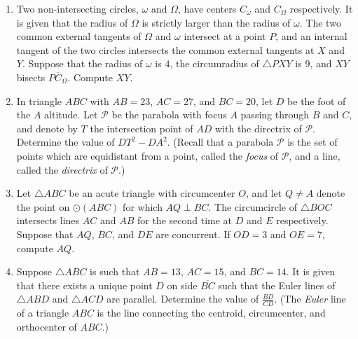 \documentclass[10pt]{article}
\begin{document}
\begin{enumerate}
\item Two non-intersecting circles, $\omega$ and $\Omega$, have centers $C_\omega$ and $C_\Omega$ respectively.  It is given that the radius of $\Omega$ is strictly larger than the radius of $\omega$.  The two common external tangents of $\Omega$ and $\omega$ intersect at a point $P$, and an internal tangent of the two circles intersects the common external tangents at $X$ and $Y$.  Suppose that the radius of $\omega$ is $4$, the circumradius of $\triangle PXY$ is $9$, and $XY$ bisects $\overline{PC_\Omega}$.  Compute $XY$.

\item In triangle $ABC$ with $AB=23$, $AC=27$, and $BC=20$, let $D$ be the foot of the $A$ altitude.  Let $\mathcal{P}$ be the parabola with focus $A$ passing through $B$ and $C$, and denote by $T$ the intersection point of $AD$ with the directrix of $\mathcal P$.  Determine the value of $DT^2-DA^2$. (Recall that a parabola $\mathcal P$ is the set of points which are equidistant from a point, called the \textit{focus} of $\mathcal P$, and a line, called the \textit{directrix} of $\mathcal P$.)

\item Let $\triangle ABC$ be an acute triangle with circumcenter $O$, and let $Q\neq A$ denote the point on $\odot (ABC)$ for which $AQ\perp BC$. The circumcircle of $\triangle BOC$ intersects lines $AC$ and $AB$ for the second time at $D$ and $E$ respectively. Suppose that $AQ$, $BC$, and $DE$ are concurrent. If $OD=3$ and $OE=7$, compute $AQ$.

\item Suppose $\triangle ABC$ is such that $AB=13$, $AC=15$, and $BC=14$.  It is given that there exists a unique point $D$ on side $\overline{BC}$ such that the Euler lines of $\triangle ABD$ and $\triangle ACD$ are parallel.  Determine the value of $\tfrac{BD}{CD}$.  (The \textit{Euler} line of a triangle $ABC$ is the line connecting the centroid, circumcenter, and orthocenter of $ABC$.)


\end{enumerate}
\end{document}

